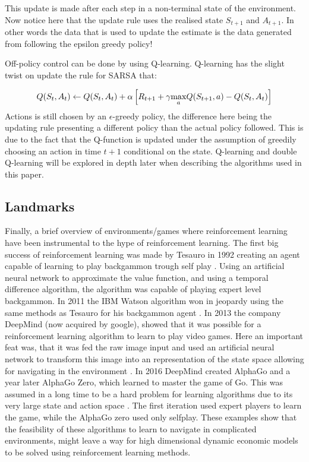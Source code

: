 This update is made after each step in a non-terminal state of the environment. 
Now notice here that the update rule uses the realised state $S_{t+1}$ and $A_{t+1}$. In other words the data that is used to update the estimate is the data generated from following the epsilon greedy policy! 

Off-policy control can be done by using Q-learning. Q-learning has the slight twist on update the rule for SARSA that:

\begin{equation}
    Q(S_t, A_t) \leftarrow Q(S_t, A_t) + \alpha \left[ R_{t+1} + \gamma \underset{a}{\max} Q(S_{t + 1}, a) - Q(S_t, A_t) \right] 
\end{equation}
Actions is still chosen by an $\epsilon$-greedy policy, the difference here being the updating rule presenting a different policy than the actual policy followed. This is due to the fact that the Q-function is updated under the assumption of greedily choosing an action in time $t+1$ conditional on the state. Q-learning and double Q-learning will be explored in depth later when describing the algorithms used in this paper.

\subsection{Landmarks}

Finally, a brief overview of environments/games where reinforcement learning have been instrumental to the hype of reinforcement learning. The first big success of reinforcement learning was made by Tesauro in 1992 creating an agent capable of learning to play backgammon trough self play \parencite{sutton_reinforcement_2018}. Using an artificial neural network to approximate the value function, and using a temporal difference algorithm, the algorithm was capable of playing expert level backgammon. In 2011 the IBM Watson algorithm won in jeopardy using the same methods as Tesauro for his backgammon agent \parencite{sutton_reinforcement_2018}. In 2013 the company DeepMind (now acquired by google), showed that it was possible for a reinforcement learning algorithm to learn to play video games. Here an important feat was, that it was fed the raw image input and used an artificial neural network to transform this image into an representation of the state space allowing for navigating in the environment \parencite{mnih_playing_2013}. In 2016 DeepMind created AlphaGo and a year later AlphaGo Zero, which learned to master the game of Go. This was assumed in a long time to be a hard problem for learning algorithms due to its very large state and action space \parencite{silver_general_2018}. The first iteration used expert players to learn the game, while the AlphaGo zero used only selfplay. These examples show that the feasibility of these algorithms to learn to navigate in complicated environments, might leave a way for high dimensional dynamic economic models to be solved using reinforcement learning methods.
